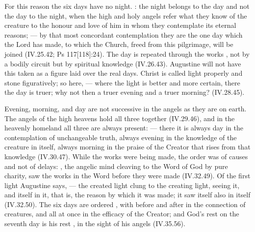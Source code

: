 For this reason the six days have no night. : the night belongs to the day and not the
day to the night, when the high and holy angels refer what they know of
the creature to the honour and love of him in whom they contemplate its
eternal reasons;  --- by that most concordant contemplation they are the one day
which the Lord has made, to which the Church, freed from this
pilgrimage, will be joined (IV.25.42; Ps 117[118]:24). The day is
repeated through the works , not by a bodily circuit but by spiritual knowledge (IV.26.43). Augustine will not have this taken as a figure laid over the
real days. Christ is called light properly and stone figuratively; so
here,  --- where the light is better
and more certain, there the day is truer; why not then a truer evening and
a truer morning? (IV.28.45).

Evening, morning, and day are not successive in the angels as they are on
earth. The angels of the high heavens hold all three together
(IV.29.46), and in the heavenly homeland all three are always present:
 --- there it is always day in the
contemplation of unchangeable truth, always evening in the knowledge of the
creature in itself, always morning in the praise of the Creator that
rises from that knowledge (IV.30.47). While the works were being made,
the order was of causes and not of delays: , the angelic mind cleaving to the Word of
God by pure charity, saw the works in the Word before they were made
(IV.32.49). Of the first light Augustine says,
 --- the created
light clung to the creating light, seeing it, and itself in it, that is,
the reason by which it was made; it saw itself also in itself (IV.32.50).
The six days are ordered , with before and
after in the connection of creatures, and all at once in the efficacy of
the Creator; and God's rest on the seventh day is his rest , in the sight of his angels (IV.35.56).

